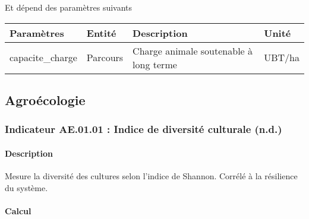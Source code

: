 \documentclass[
]{article}
\begin{document}
Et dépend des paramètres suivants

\begin{longtable}[]{@{}
  >{\raggedright\arraybackslash}p{}
  >{\raggedright\arraybackslash}p{}
  >{\raggedright\arraybackslash}p{}
  >{\raggedright\arraybackslash}p{}@{}}
\toprule\noalign{}
\begin{minipage}[b]{\linewidth}\raggedright
\textbf{Paramètres}
\end{minipage} & \begin{minipage}[b]{\linewidth}\raggedright
\textbf{Entité}
\end{minipage} & \begin{minipage}[b]{\linewidth}\raggedright
\textbf{Description}
\end{minipage} & \begin{minipage}[b]{\linewidth}\raggedright
\textbf{Unité}
\end{minipage} \\
\midrule\noalign{}
\endhead
\bottomrule\noalign{}
\endlastfoot
capacite\_charge & Parcours & Charge animale soutenable à long terme &
UBT/ha \\
\end{longtable}

\subsection{Agroécologie}\label{agrouxe9cologie}

\subsubsection{Indicateur AE.01.01 : Indice de diversité culturale
(n.d.)}\label{indicateur-ae.01.01-indice-de-diversituxe9-culturale-n.d.}

\paragraph{Description}\label{description-8}

Mesure la diversité des cultures selon l'indice de Shannon. Corrélé à la
résilience du système.

\paragraph{Calcul}\label{calcul-8}
\end{document}
